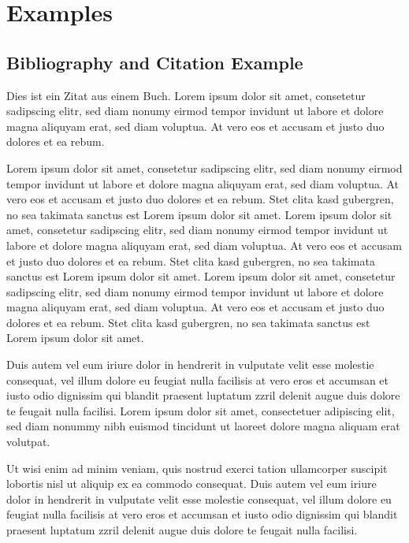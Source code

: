 \chapter*{Examples}


\section*{Bibliography and Citation Example}

Dies ist ein Zitat aus einem Buch\cite{Matthews201111}. Lorem ipsum dolor sit amet, consetetur sadipscing elitr, sed diam nonumy eirmod tempor invidunt ut labore et dolore magna aliquyam erat, sed diam voluptua. At vero eos et accusam et justo duo dolores et ea rebum.

Lorem ipsum dolor sit amet, consetetur sadipscing elitr, sed diam nonumy eirmod tempor invidunt ut labore et dolore magna aliquyam erat, sed diam voluptua. At vero eos et accusam et justo duo dolores et ea rebum. Stet clita kasd gubergren, no sea takimata sanctus est Lorem ipsum dolor sit amet. Lorem ipsum dolor sit amet, consetetur sadipscing elitr, sed diam nonumy eirmod tempor invidunt ut labore et dolore magna aliquyam erat, sed diam voluptua. At vero eos et accusam et justo duo dolores et ea rebum. Stet clita kasd gubergren, no sea takimata sanctus est Lorem ipsum dolor sit amet. Lorem ipsum dolor sit amet, consetetur sadipscing elitr, sed diam nonumy eirmod tempor invidunt ut labore et dolore magna aliquyam erat, sed diam voluptua. At vero eos et accusam et justo duo dolores et ea rebum. Stet clita kasd gubergren, no sea takimata sanctus est Lorem ipsum dolor sit amet. 

Duis autem vel eum iriure dolor in hendrerit in vulputate velit esse molestie consequat, vel illum dolore eu feugiat nulla facilisis at vero eros et accumsan et iusto odio dignissim qui blandit praesent luptatum zzril delenit augue duis dolore te feugait nulla facilisi. Lorem ipsum dolor sit amet, consectetuer adipiscing elit, sed diam nonummy nibh euismod tincidunt ut laoreet dolore magna aliquam erat volutpat. 

Ut wisi enim ad minim veniam, quis nostrud exerci tation ullamcorper suscipit lobortis nisl ut aliquip ex ea commodo consequat. Duis autem vel eum iriure dolor in hendrerit in vulputate velit esse molestie consequat, vel illum dolore eu feugiat nulla facilisis at vero eros et accumsan et iusto odio dignissim qui blandit praesent luptatum zzril delenit augue duis dolore te feugait nulla facilisi. 


